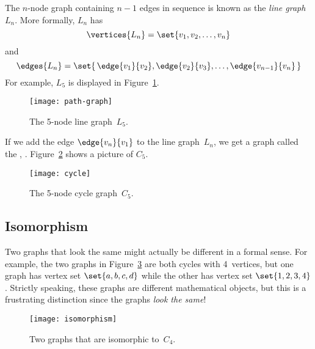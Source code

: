 The $n$-node graph containing $n - 1$ edges in sequence is known as
the \emph{line graph}~$L_n$.  More formally, $L_n$ has
\begin{equation*}
    \vertices{L_n} = \set{ v_1, v_2, \dots, v_n }
\end{equation*}
and
\begin{equation*}
    \edges{L_n} = \set{\, \edge{v_1}{v_2}, \edge{v_2}{v_3}, \dots,
    \edge{v_{n-1}}{v_n} \, }
\end{equation*}
For example, $L_5$ is displayed in Figure~\ref{fig:graph_L_5}.

\begin{figure}\redrawn

\texttt{[image: path-graph]}

\caption{The 5-node line graph~$L_5$.}

\label{fig:graph_L_5}

\end{figure}

If we add the edge $\edge{v_n}{v_1}$ to the line graph~$L_n$, we get a
graph called the , .
Figure~\ref{fig:graph_C_5} shows a picture of $C_5$.

\begin{figure}\redrawn

\texttt{[image: cycle]}

\caption{The 5-node cycle graph~$C_5$.}
\label{fig:graph_C_5}
\end{figure}

\subsection{Isomorphism}

Two graphs that look the same might actually be different in a formal
sense.  For example, the two graphs in Figure~\ref{fig:isomorphism}
are both cycles with 4~vertices, but one graph has vertex set
$\set{a, b, c, d}$ while the other has vertex set $\set{1, 2, 3, 4}$.
Strictly speaking, these graphs are different mathematical objects,
but this is a frustrating distinction since the graphs \emph{look the
same}!

\begin{figure}\redrawn


\texttt{[image: isomorphism]}

\caption{Two graphs that are isomorphic to~$C_4$.}
\label{fig:isomorphism}
\end{figure}

